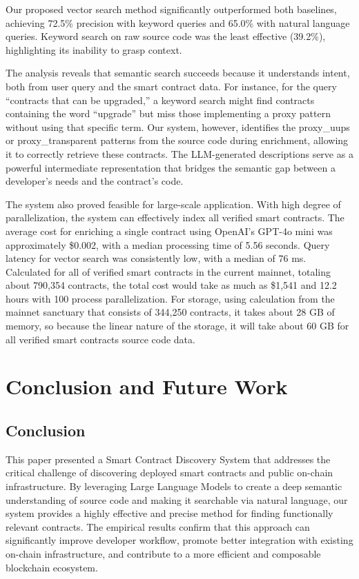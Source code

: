 Our proposed vector search method significantly outperformed both baselines, achieving 72.5\% precision with keyword queries and 65.0\% with natural language queries. Keyword search on raw source code was the least effective (39.2\%), highlighting its inability to grasp context.

The analysis reveals that semantic search succeeds because it understands intent, both from user query and the smart contract data. For instance, for the query ``contracts that can be upgraded,'' a keyword search might find contracts containing the word ``upgrade'' but miss those implementing a proxy pattern without using that specific term. Our system, however, identifies the proxy\_uups or proxy\_transparent patterns from the source code during enrichment, allowing it to correctly retrieve these contracts. The LLM-generated descriptions serve as a powerful intermediate representation that bridges the semantic gap between a developer's needs and the contract's code.

The system also proved feasible for large-scale application. With high degree of parallelization, the system can effectively index all verified smart contracts. The average cost for enriching a single contract using OpenAI's GPT-4o mini was approximately \$0.002, with a median processing time of 5.56 seconds. Query latency for vector search was consistently low, with a median of 76 ms. Calculated for all of verified smart contracts in the current mainnet, totaling about 790,354 contracts, the total cost would take as much as \$1,541 and 12.2 hours with 100 process parallelization. For storage, using calculation from the mainnet sanctuary that consists of 344,250 contracts, it takes about 28 GB of memory, so because the linear nature of the storage, it will take about 60 GB for all verified smart contracts source code data.

\section{Conclusion and Future Work}\label{sec:conclusion}

\subsection{Conclusion}
This paper presented a Smart Contract Discovery System that addresses the critical challenge of discovering deployed smart contracts and public on-chain infrastructure. By leveraging Large Language Models to create a deep semantic understanding of source code and making it searchable via natural language, our system provides a highly effective and precise method for finding functionally relevant contracts. The empirical results confirm that this approach can significantly improve developer workflow, promote better integration with existing on-chain infrastructure, and contribute to a more efficient and composable blockchain ecosystem.

